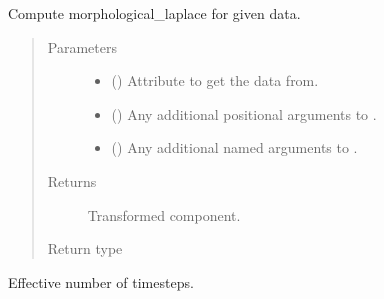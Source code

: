 \documentclass[letterpaper,10pt,english]{sphinxmanual}
\begin{document}
\begin{fulllineitems}
\begin{fulllineitems}
\label{\detokenize{api/states:geology.src.States.morphological_laplace}}
Compute morphological\_laplace for given data.
\begin{quote}\begin{description}
\item[{Parameters}] \leavevmode\begin{itemize}
\item {} 
 (\sphinxstyleliteralemphasis{\sphinxupquote{, }}) \textendash{} Attribute to get the data from.

\item {} 
 () \textendash{} Any additional positional arguments to .

\item {} 
 () \textendash{} Any additional named arguments to .

\end{itemize}

\item[{Returns}] \leavevmode
{} \textendash{} Transformed component.

\item[{Return type}] \leavevmode
{\hyperref[\detokenize{api/base_classes:geology.src.base_spatial.SpatialComponent}]{}}

\end{description}\end{quote}

\end{fulllineitems}


\begin{fulllineitems}
\label{\detokenize{api/states:geology.src.States.n_timesteps}}
Effective number of timesteps.


\end{fulllineitems}
\end{fulllineitems}
\end{document}
